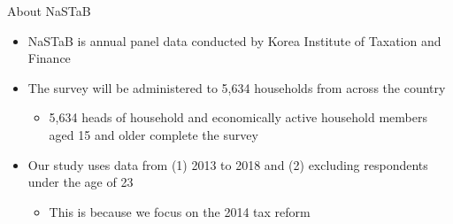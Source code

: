 \documentclass[
  ignorenonframetext,
  aspectratio=169,
]{beamer}
\providecommand{\tightlist}{%
  \setlength{\itemsep}{0pt}\setlength{\parskip}{0pt}}
\begin{document}
\begin{frame}{About NaSTaB}
\protect\hypertarget{about-nastab}{}
\begin{itemize}
\tightlist
\item
  NaSTaB is annual panel data conducted by
  Korea Institute of Taxation and Finance
\item
  The survey will be administered to 5,634 households
  from across the country

  \begin{itemize}
  \tightlist
  \item
    5,634 heads of household and
    economically active household members aged 15 and older
    complete the survey
  \end{itemize}
\item
  Our study uses data from (1) 2013 to 2018 and (2) excluding
  respondents under the age of 23

  \begin{itemize}
  \tightlist
  \item
    This is because we focus on the 2014 tax reform
  \end{itemize}
\end{itemize}
\end{frame}
\end{document}
